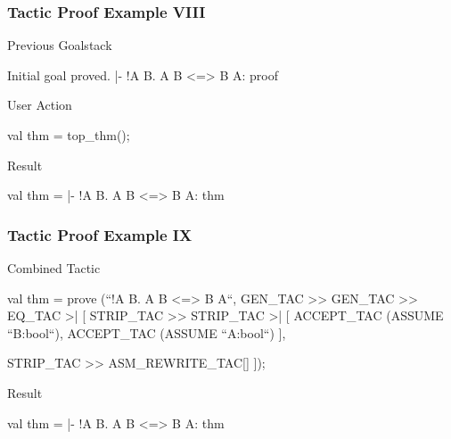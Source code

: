 \begin{frame}[fragile]
\frametitle{Tactic Proof Example VIII}

\begin{block}{Previous Goalstack}
\begin{semiverbatim}
\scriptsize{}Initial goal proved.
|- !A B. A \holAnd{} B <=> B \holAnd{} A:
   proof
\end{semiverbatim}
\end{block}

\begin{block}{User Action}
\begin{semiverbatim}
\scriptsize{}val thm = top_thm();
\end{semiverbatim}
\end{block}

\begin{block}{Result}
\begin{semiverbatim}
\scriptsize{}val thm =
   |- !A B. A \holAnd{} B <=> B \holAnd{} A:
   thm
\end{semiverbatim}
\end{block}

\end{frame}


\begin{frame}[fragile]
\frametitle{Tactic Proof Example IX}

\begin{block}{Combined Tactic}
\begin{semiverbatim}
\scriptsize{}val thm = prove (``!A B. A \holAnd{} B <=> B \holAnd{} A``,
  GEN_TAC >> GEN_TAC >>
  EQ_TAC >| [
    STRIP_TAC >>
    STRIP_TAC >| [
      ACCEPT_TAC (ASSUME ``B:bool``),
      ACCEPT_TAC (ASSUME ``A:bool``)
    ],

    STRIP_TAC >>
    ASM_REWRITE_TAC[]
  ]);
\end{semiverbatim}
\end{block}

\begin{block}{Result}
\begin{semiverbatim}
\scriptsize{}val thm =
   |- !A B. A \holAnd{} B <=> B \holAnd{} A:
   thm
\end{semiverbatim}
\end{block}
\end{frame}

